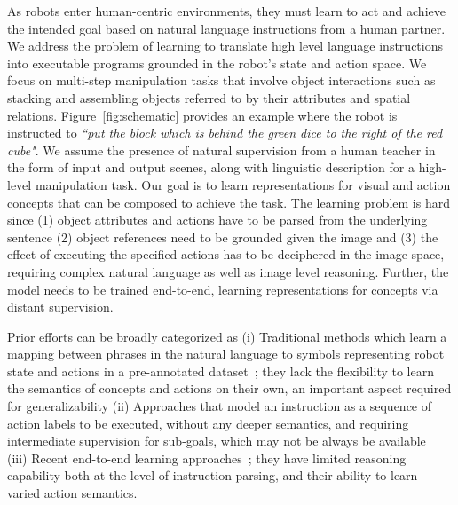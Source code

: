 \label{sec:intro}
As robots enter human-centric environments, they must learn to act and achieve the intended goal based on natural language instructions from a human partner. 
%
We address the problem of learning to translate high level language instructions into
executable programs grounded in the robot’s state and action space. 
%
We focus on multi-step manipulation tasks that involve object interactions such as stacking and assembling objects referred to by their attributes and spatial relations. 
%
Figure~\ref{fig:schematic} provides an example where the robot is instructed to 
\emph{``put the block which is behind the green dice to the right of the red cube"}.  
%
We assume the presence of natural supervision from a human teacher in the form of 
input and output scenes, along with linguistic description for a high-level manipulation task. Our goal 
is to learn representations for visual and action concepts that can be composed to achieve the task. 
%
The learning problem is hard since (1) object attributes and actions have to be parsed from the underlying sentence (2) object references need to be grounded given the image and (3) the effect of executing the specified actions has to be deciphered in the image space, requiring complex natural language as well as image level reasoning. Further, the model needs to be trained end-to-end, learning representations for concepts via distant supervision.

Prior efforts can be broadly categorized as 
(i) Traditional methods which learn a mapping between phrases in the natural language to symbols representing robot state and actions in a pre-annotated dataset~\cite{howard2014natural,paul2016efficient,tellex2011approaching,matuszek2013learning,knepper2013ikeabot,gopalan2018sequence,williams2018learning}; they lack the flexibility to learn the semantics of concepts and actions on their own, an important aspect required for generalizability (ii) Approaches that model an instruction as a sequence of action labels to be executed, without any deeper semantics, and requiring intermediate supervision for sub-goals, which may not be always be available~\cite{paxton2019prospection,shah2018bayesian,wang2020learning,kress2008translating,lazaro2019beyond,tenorth2010understanding,lisca2015towards,misra2016tell} 
(iii) Recent end-to-end learning approaches~\cite{konidaris2018skills,wang2021learning, zettlemoyer2005learning,xia2018learning,silver2020few,zhu2021hierarchical,shridhar2022cliport,zeng2020transporter}; they have limited reasoning capability both at the level of instruction parsing, and their ability to learn varied action semantics.

